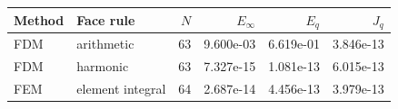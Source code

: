 \begin{tabular}{llrrrr}
\toprule
Method & Face rule & $N$ & $E_\infty$ & $E_q$ & $J_q$\\
\midrule
FDM & arithmetic & 63 & 9.600e-03 & 6.619e-01 & 3.846e-13\\
FDM & harmonic & 63 & 7.327e-15 & 1.081e-13 & 6.015e-13\\
FEM & element integral & 64 & 2.687e-14 & 4.456e-13 & 3.979e-13\\
\bottomrule
\end{tabular}
